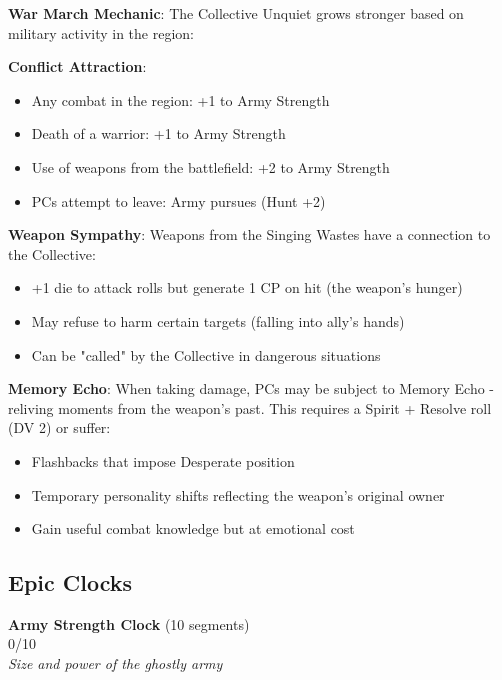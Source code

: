 \documentclass[11pt]{article}
\newcommand{\clocksegment}{\textbullet}
\begin{document}
\begin{mdframed}[backgroundcolor=mechanicbg]
\textbf{War March Mechanic}: The Collective Unquiet grows stronger based on military activity in the region:

\textbf{Conflict Attraction}: 
\begin{itemize}[leftmargin=*]
\item Any combat in the region: +1 to Army Strength
\item Death of a warrior: +1 to Army Strength
\item Use of weapons from the battlefield: +2 to Army Strength
\item PCs attempt to leave: Army pursues (Hunt +2)
\end{itemize}

\textbf{Weapon Sympathy}: Weapons from the Singing Wastes have a connection to the Collective:
\begin{itemize}[leftmargin=*]
\item +1 die to attack rolls but generate 1 CP on hit (the weapon's hunger)
\item May refuse to harm certain targets (falling into ally's hands)
\item Can be "called" by the Collective in dangerous situations
\end{itemize}

\textbf{Memory Echo}: When taking damage, PCs may be subject to Memory Echo - reliving moments from the weapon's past. This requires a Spirit + Resolve roll (DV 2) or suffer:
\begin{itemize}[leftmargin=*]
\item Flashbacks that impose Desperate position
\item Temporary personality shifts reflecting the weapon's original owner
\item Gain useful combat knowledge but at emotional cost
\end{itemize}
\end{mdframed}

\subsection*{Epic Clocks}

\begin{center}
\textbf{Army Strength Clock} (10 segments)\\
\fbox{\clocksegment\clocksegment\clocksegment\clocksegment\clocksegment\clocksegment\clocksegment\clocksegment\clocksegment\clocksegment} 0/10\\
\textit{Size and power of the ghostly army}
\end{center}
\end{document}
